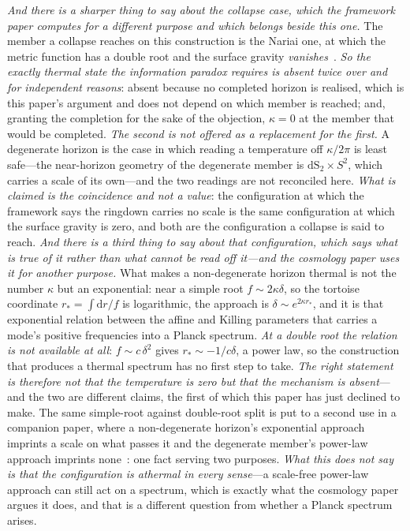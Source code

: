 \documentclass[11pt,a4paper]{article}
\theoremstyle{plain}
\theoremstyle{remark}
\newcommand{\dd}{\mathrm{d}}
\begin{document}
\emph{And there is a sharper thing to say about the collapse case, which the framework paper computes for a
different purpose and which belongs beside this one.} The member a collapse reaches on this
construction is the Nariai one, at which the metric function has a double root and the surface gravity
\emph{vanishes}~\cite{JanzenCRframework}. \emph{So the exactly thermal state the information paradox requires is absent
twice over and for independent reasons}: absent because no completed horizon is realised, which is this
paper's argument and does not depend on which member is reached; and, granting the completion for the sake of
the objection, $\kappa=0$ at the member that would be completed. \emph{The second is not offered as a
replacement for the first.} A degenerate horizon is the case in which reading a temperature off $\kappa/2\pi$
is least safe---the near-horizon geometry of the degenerate member is $\mathrm{dS}_{2}\times S^{2}$, which
carries a scale of its own---and the two readings
are not reconciled here. \emph{What is claimed is the coincidence and not a value}: the configuration at which
the framework says the ringdown carries no scale is the same configuration at which the surface gravity is
zero, and both are the configuration a collapse is said to reach.
\emph{And there is a third thing to say about that configuration, which says what is true of it rather than what cannot be read off it---and the cosmology paper uses it for another purpose.} What makes a non-degenerate horizon thermal is not the number $\kappa$ but an exponential: near a simple root $f\sim2\kappa\delta$, so the tortoise coordinate $r_{*}=\int\dd r/f$ is logarithmic, the approach is $\delta\sim e^{2\kappa r_{*}}$, and it is that exponential relation between the affine and Killing parameters that carries a mode's positive frequencies into a Planck spectrum. \emph{At a double root the relation is not available at all}: $f\sim c\,\delta^{2}$ gives $r_{*}\sim-1/c\delta$, a power law, so the construction that produces a thermal spectrum has no first step to take. \emph{The right statement is therefore not that the temperature is zero but that the mechanism is absent}---and the two are different claims, the first of which this paper has just declined to make. The same simple-root against double-root split is put to a second use in a companion paper, where a non-degenerate horizon's exponential approach imprints a scale on what passes it and the degenerate member's power-law approach imprints none~\cite{JanzenCRcosmology}: one fact serving two purposes. \emph{What this does not say is that the configuration is athermal in every sense}---a scale-free power-law approach can still act on a spectrum, which is exactly what the cosmology paper argues it does, and that is a different question from whether a Planck spectrum arises.
\end{document}
